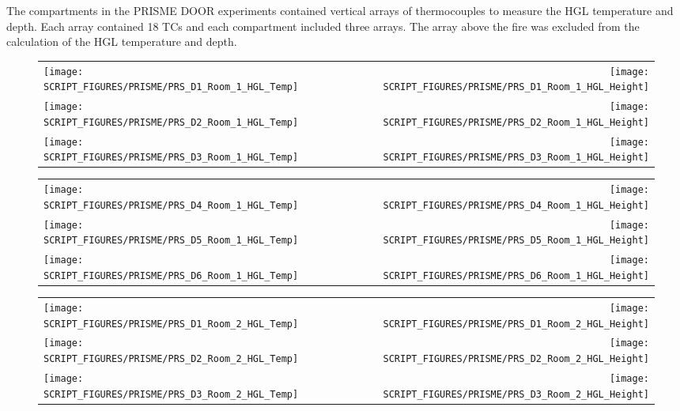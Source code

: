 The compartments in the PRISME DOOR experiments contained vertical arrays of thermocouples to measure the HGL temperature and depth. Each array contained 18 TCs and each compartment included three arrays. The array above the fire was excluded from the calculation of the HGL temperature and depth.

\begin{figure}[!ht]
\begin{tabular*}{\textwidth}{l@{\extracolsep{\fill}}r}
\texttt{[image: SCRIPT\_FIGURES/PRISME/PRS\_D1\_Room\_1\_HGL\_Temp]} &
\texttt{[image: SCRIPT\_FIGURES/PRISME/PRS\_D1\_Room\_1\_HGL\_Height]} \\
\texttt{[image: SCRIPT\_FIGURES/PRISME/PRS\_D2\_Room\_1\_HGL\_Temp]} &
\texttt{[image: SCRIPT\_FIGURES/PRISME/PRS\_D2\_Room\_1\_HGL\_Height]} \\
\texttt{[image: SCRIPT\_FIGURES/PRISME/PRS\_D3\_Room\_1\_HGL\_Temp]} &
\texttt{[image: SCRIPT\_FIGURES/PRISME/PRS\_D3\_Room\_1\_HGL\_Height]}
\end{tabular*}
\label{PRISME_HGL_1}
\end{figure}

\begin{figure}[p]
\begin{tabular*}{\textwidth}{l@{\extracolsep{\fill}}r}
\texttt{[image: SCRIPT\_FIGURES/PRISME/PRS\_D4\_Room\_1\_HGL\_Temp]} &
\texttt{[image: SCRIPT\_FIGURES/PRISME/PRS\_D4\_Room\_1\_HGL\_Height]} \\
\texttt{[image: SCRIPT\_FIGURES/PRISME/PRS\_D5\_Room\_1\_HGL\_Temp]} &
\texttt{[image: SCRIPT\_FIGURES/PRISME/PRS\_D5\_Room\_1\_HGL\_Height]} \\
\texttt{[image: SCRIPT\_FIGURES/PRISME/PRS\_D6\_Room\_1\_HGL\_Temp]} &
\texttt{[image: SCRIPT\_FIGURES/PRISME/PRS\_D6\_Room\_1\_HGL\_Height]}
\end{tabular*}
\label{PRISME_HGL_2}
\end{figure}

\begin{figure}[p]
\begin{tabular*}{\textwidth}{l@{\extracolsep{\fill}}r}
\texttt{[image: SCRIPT\_FIGURES/PRISME/PRS\_D1\_Room\_2\_HGL\_Temp]} &
\texttt{[image: SCRIPT\_FIGURES/PRISME/PRS\_D1\_Room\_2\_HGL\_Height]} \\
\texttt{[image: SCRIPT\_FIGURES/PRISME/PRS\_D2\_Room\_2\_HGL\_Temp]} &
\texttt{[image: SCRIPT\_FIGURES/PRISME/PRS\_D2\_Room\_2\_HGL\_Height]} \\
\texttt{[image: SCRIPT\_FIGURES/PRISME/PRS\_D3\_Room\_2\_HGL\_Temp]} &
\texttt{[image: SCRIPT\_FIGURES/PRISME/PRS\_D3\_Room\_2\_HGL\_Height]}
\end{tabular*}
\label{PRISME_HGL_3}
\end{figure}

